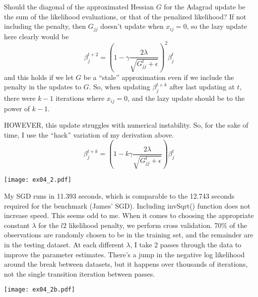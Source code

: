 \documentclass{article}
\begin{document}
Should the diagonal of the approximated Hessian $G$ for the Adagrad update be the sum of the likelihood evaluations, or that of the penalized likelihood? If not including the penalty, then $G_{jj}$ doesn't update when $x_{ij} =0$, so the lazy update here clearly would be 
$$\beta_j^{t+2} = \left(1 - \gamma \frac{2 \lambda}{\sqrt{G_{jj}^t + \epsilon}}\right)^2 \beta_j^t $$
and this holds if we let $G$ be a ``stale'' approximation even if we include the penalty in the updates to $G$.  So, when updating $\beta_j^{t+k}$ after last updating at $t$, there were $k-1$ iterations where $x_{ij} = 0$, and the lazy update should be to the power of $k-1$. 

HOWEVER, this update struggles with numerical instability. So, for the sake of time, I use the ``hack'' variation of my derivation above. 
$$\beta_j^{t+k} = \left(1 - k\gamma \frac{2 \lambda}{\sqrt{G_{jj}^t + \epsilon}}\right)\beta_j^t $$

\begin{center}
\texttt{[image: ex04\_2.pdf]}
\end{center}
My SGD runs in 11.393 seconds, which is comparable to the 12.743 seconds required for the benchmark (James' SGD).  Including invSqrt() function does not increase speed. This seems odd to me. When it comes to choosing the appropriate constant $\lambda$ for the $l2$ likelihood penalty, we perform cross validation. 70\% of the observations are randomly chosen to be in the training set, and the remainder are in the testing dataset. At each different $\lambda$, I take 2 passes through the data to improve the parameter estimates. There's a jump in the negative log likelihood around the break between datasets, but it happens over thousands of iterations, not the single transition iteration between passes. 

\begin{center}
\texttt{[image: ex04\_2b.pdf]}
\end{center}
    
\end{document}
